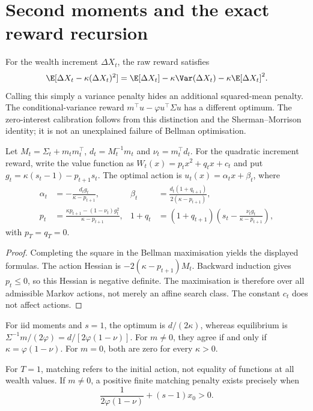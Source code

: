 \ifdim\dimexpr\pagegoal-\pagetotal\relax<120pt\newpage\fi
\section{Second moments and the exact reward recursion}
\label{app:recursion}
For the wealth increment $\Delta X_t$, the raw reward satisfies
\[
 \E[\Delta X_t-\kappa(\Delta X_t)^2]
 =\E[\Delta X_t]-\kappa\Var(\Delta X_t)-\kappa\E[\Delta X_t]^2.
\]
Calling this simply a variance penalty hides an additional squared-mean penalty.
The conditional-variance reward $m^{\top}u-\varphi u^{\top}\Sigma u$ has a different
optimum. The zero-interest calibration follows from this distinction and the
Sherman--Morrison identity; it is not an unexplained failure of Bellman optimisation.

\begin{proposition}
Let $M_t=\Sigma_t+m_tm_t^{\top}$, $d_t=M_t^{-1}m_t$ and
$\nu_t=m_t^{\top}d_t$. For the quadratic increment reward, write the value function as
$W_t(x)=p_tx^2+q_tx+c_t$ and put
$g_t=\kappa(s_t-1)-p_{t+1}s_t$. The optimal action is
$u_t(x)=\alpha_tx+\beta_t$, where
\begin{align}
 \alpha_t&=-\frac{d_tg_t}{\kappa-p_{t+1}},&
 \beta_t&=\frac{d_t(1+q_{t+1})}{2(\kappa-p_{t+1})},\\
 p_t&=\frac{\kappa p_{t+1}-(1-\nu_t)g_t^2}{\kappa-p_{t+1}},&
 1+q_t&=(1+q_{t+1})\left(s_t-\frac{\nu_tg_t}{\kappa-p_{t+1}}\right),
\end{align}
with $p_T=q_T=0$.
\end{proposition}
\begin{proof}
Completing the square in the Bellman maximisation yields the displayed formulas.
The action Hessian is $-2(\kappa-p_{t+1})M_t$. Backward induction gives $p_t\le0$,
so this Hessian is negative definite. The maximisation is therefore over all
admissible Markov actions, not merely an affine search class. The constant $c_t$
does not affect actions.
\end{proof}
For iid moments and $s=1$, the optimum is $d/(2\kappa)$, whereas equilibrium is
$\Sigma^{-1}m/(2\varphi)=d/[2\varphi(1-\nu)]$. For $m\ne0$, they agree if and
only if $\kappa=\varphi(1-\nu)$. For $m=0$, both are zero for every $\kappa>0$.

For $T=1$, matching refers to the initial action, not equality of functions at
all wealth values. If $m\ne0$, a positive finite matching penalty exists precisely when
\[
 \frac{1}{2\varphi(1-\nu)}+(s-1)x_0>0.
\]

